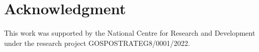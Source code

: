 \documentclass[conference]{IEEEtran}
\begin{document}



\section*{Acknowledgment}
This work was supported by the National Centre for Research and Development under the research project \mbox{GOSPOSTRATEG8/0001/2022}.




\end{document}
